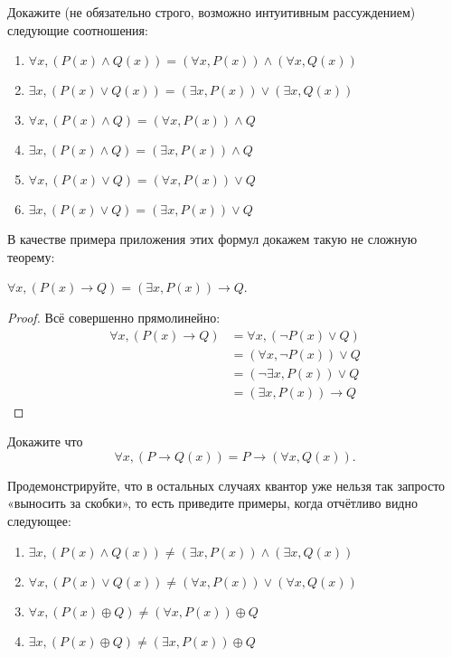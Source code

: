 \begin{exercise} Докажите (не обязательно строго, возможно интуитивным рассуждением) следующие соотношения:
\begin{enumerate}
\item   $\forall x, (P(x) \wedge Q(x)) = (\forall x, P(x))\wedge (\forall x, Q(x))$
\item   $\exists x, (P(x) \vee Q(x)) = (\exists x, P(x))\vee (\exists x, Q(x))$
\item   $\forall x, (P(x) \wedge Q) = (\forall x, P(x))\wedge Q$
\item   $\exists x, (P(x) \wedge Q) = (\exists x, P(x))\wedge Q$
\item   $\forall x, (P(x) \vee Q) = (\forall x, P(x))\vee Q$
\item   $\exists x, (P(x) \vee Q) = (\exists x, P(x))\vee Q$
\end{enumerate}
\end{exercise}

В качестве примера приложения этих формул докажем такую не сложную теорему:

\begin{thm}$\forall x, (P(x)\to Q) = (\exists x, P(x))\to Q$.\end{thm}
\begin{proof}Всё совершенно прямолинейно:
\begin{align*}
\forall x, (P(x)\rightarrow Q) &= \forall x, (\neg P(x) \vee Q)\\
 &= (\forall x, \neg P(x)) \vee Q \\
&= (\neg\exists x, P(x))\vee Q\\
 &= (\exists x, P(x))\rightarrow Q
\end{align*}\end{proof}

\begin{exercise}Докажите что  $$\forall x, (P\to Q(x)) = P\to (\forall x, Q(x)).$$\end{exercise}

\begin{exercise}Продемонстрируйте, что в остальных случаях квантор уже нельзя так запросто «выносить за скобки», то есть приведите примеры, когда отчётливо видно следующее:
\begin{enumerate}
\item   $\exists x,(P(x)\wedge Q(x))\not=(\exists x, P(x))\wedge (\exists x,Q(x))$
\item   $\forall x, (P(x) \vee Q(x)) \not= (\forall x, P(x))\vee (\forall x, Q(x))$
\item   $\forall x, (P(x) \oplus Q) \not= (\forall x, P(x))\oplus Q$
\item   $\exists x, (P(x) \oplus Q) \not= (\exists x, P(x))\oplus Q$
\end{enumerate}
\end{exercise}